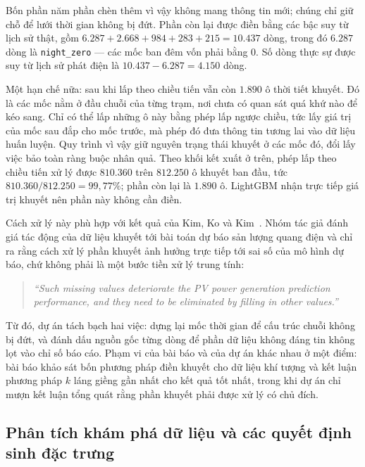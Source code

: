 \documentclass[12pt, a4paper]{report}
\begin{document}
Bốn phần năm phần chèn thêm vì vậy không mang thông tin mới; chúng chỉ giữ chỗ để
lưới thời gian không bị đứt. Phần còn lại được điền bằng các bậc suy từ lịch sử thật, gồm
$6.287 + 2.668 + 984 + 283 + 215 = 10.437$ dòng, trong đó $6.287$ dòng là \texttt{night\_zero} ---
các mốc ban đêm vốn phải bằng $0$. Số dòng thực sự được suy từ lịch sử phát điện là
$10.437 - 6.287 = 4.150$ dòng.

Một hạn chế nữa: sau khi lấp theo chiều tiến vẫn còn $1.890$ ô thời tiết khuyết. Đó là các mốc
nằm ở đầu chuỗi của từng trạm, nơi chưa có quan sát quá khứ nào để kéo sang. Chỉ có thể lấp
những ô này bằng phép lấp ngược chiều, tức lấy giá trị của mốc sau đắp cho mốc trước, mà phép đó
đưa thông tin tương lai vào dữ liệu huấn luyện. Quy trình vì vậy giữ nguyên trạng thái khuyết
ở các mốc đó, đổi lấy việc bảo toàn ràng buộc nhân quả. Theo khối kết xuất ở trên, phép lấp
theo chiều tiến xử lý được $810.360$ trên $812.250$ ô khuyết ban đầu, tức
$810.360 / 812.250 = 99{,}77\%$; phần còn lại là $1.890$ ô. LightGBM nhận trực tiếp giá trị
khuyết nên phần này không cần điền.

Cách xử lý này phù hợp với kết quả của Kim, Ko và Kim~\cite{kim2019missing}. Nhóm tác
giả đánh giá tác động của dữ liệu khuyết tới bài toán dự báo sản lượng quang điện và
chỉ ra rằng cách xử lý phần khuyết ảnh hưởng trực tiếp tới sai số của mô hình dự báo,
chứ không phải là một bước tiền xử lý trung tính:

\begin{quote}\small
\textit{``Such missing values deteriorate the PV power generation prediction performance, and they need to be eliminated by filling in other values.''}
\end{quote}


Từ đó, dự án tách bạch hai việc: dựng lại mốc thời gian để cấu trúc chuỗi
không bị đứt, và đánh dấu nguồn gốc từng dòng để phần dữ liệu không đáng tin
không lọt vào chỉ số báo cáo. Phạm vi của bài báo và của dự án khác nhau ở một điểm: bài báo khảo
sát bốn phương pháp điền khuyết cho dữ liệu khí tượng và kết luận phương pháp
$k$ láng giềng gần nhất cho kết quả tốt nhất, trong khi dự án chỉ mượn kết luận tổng
quát rằng phần khuyết phải được xử lý có chủ đích.

\FloatBarrier
\subsection{Phân tích khám phá dữ liệu và các quyết định sinh đặc trưng}
\label{subsec:kham_pha_du_lieu}
\end{document}

